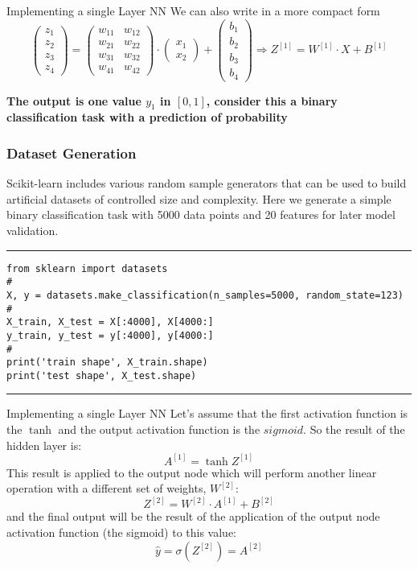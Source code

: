 \documentclass[11pt]{beamer}
\begin{document}
\begin{frame}{Implementing a single Layer NN}
We can also write in a more compact form
\begin{equation}
\begin{pmatrix}
z_1 \\ z_2 \\ z_3 \\ z_4
\end{pmatrix} =
\begin{pmatrix}
w_{11} & w_{12} \\ w_{21} & w_{22} \\ w_{31} & w_{32} \\ w_{41} & w_{42}
\end{pmatrix} 
\cdot 
\begin{pmatrix}
x_1 \\ x_2 
\end{pmatrix}
+
\begin{pmatrix}
b_1 \\ b_2 \\ b_3 \\ b_4
\end{pmatrix} 
\Rightarrow Z^{[1]} = W^{[1]} \cdot X + B^{[1]} 
\end{equation}
\vspace{0.5cm}

\textbf{The output is one value $y_1$ in $[0, 1]$, consider this a binary classification task with a prediction of probability}
\end{frame}
\begin{frame}[fragile]
\frametitle{Dataset Generation}
Scikit-learn includes various random sample generators that can be used to build artificial datasets of controlled size and complexity. Here we generate a simple binary classification task with 5000 data points and 20 features for later model validation.
\rule{\textwidth}{1pt}
\scriptsize
\begin{verbatim}
from sklearn import datasets
#
X, y = datasets.make_classification(n_samples=5000, random_state=123)
#
X_train, X_test = X[:4000], X[4000:]
y_train, y_test = y[:4000], y[4000:]
#
print('train shape', X_train.shape)
print('test shape', X_test.shape)
\end{verbatim}
\rule{\textwidth}{1pt}
\end{frame}
\begin{frame}{Implementing a single Layer NN}
Let's assume that the first activation function is the $\tanh$ and the output activation function is the $sigmoid$. So the result of the hidden layer is:
$$ A^{[1]} = \tanh{Z^{[1]}} $$
This result is applied to the output node which will perform another linear operation with a different set of weights, $W^{[2]}$:
$$ Z^{[2]} = W^{[2]} \cdot A^{[1]} + B^{[2]} $$
and the final output will be the result of the application of the output node activation function (the sigmoid) to this value:
$$ \hat{y} = \sigma({Z^{[2]}}) = A^{[2]}$$
\end{frame}
\end{document}
